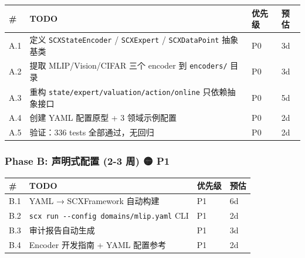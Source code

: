 \documentclass[
  12pt,
]{ctexart}
\begin{document}
\begin{longtable}[]{@{}
  >{\raggedright\arraybackslash}p{}
  >{\raggedright\arraybackslash}p{}
  >{\raggedright\arraybackslash}p{}
  >{\raggedright\arraybackslash}p{}@{}}
\toprule\noalign{}
\begin{minipage}[b]{\linewidth}\raggedright
\#
\end{minipage} & \begin{minipage}[b]{\linewidth}\raggedright
TODO
\end{minipage} & \begin{minipage}[b]{\linewidth}\raggedright
优先级
\end{minipage} & \begin{minipage}[b]{\linewidth}\raggedright
预估
\end{minipage} \\
\midrule\noalign{}
\endhead
\bottomrule\noalign{}
\endlastfoot
A.1 & 定义 \texttt{SCXStateEncoder} / \texttt{SCXExpert} /
\texttt{SCXDataPoint} 抽象基类 & P0 & 3d \\
A.2 & 提取 MLIP/Vision/CIFAR 三个 encoder 到 \texttt{encoders/} 目录 &
P0 & 3d \\
A.3 & 重构 \texttt{state/expert/valuation/action/online} 只依赖抽象接口
& P0 & 5d \\
A.4 & 创建 YAML 配置原型 + 3 领域示例配置 & P0 & 2d \\
A.5 & 验证：336 tests 全部通过，无回归 & P0 & 2d \\
\end{longtable}

\subsubsection{Phase B: 声明式配置 (2-3 周) 🟡
P1}\label{phase-b-ux58f0ux660eux5f0fux914dux7f6e-2-3-ux5468-p1}

\begin{longtable}[]{@{}llll@{}}
\toprule\noalign{}
\# & TODO & 优先级 & 预估 \\
\midrule\noalign{}
\endhead
\bottomrule\noalign{}
\endlastfoot
B.1 & YAML → SCXFramework 自动构建 & P1 & 6d \\
B.2 & \texttt{scx\ run\ -\/-config\ domains/mlip.yaml} CLI & P1 & 2d \\
B.3 & 审计报告自动生成 & P1 & 3d \\
B.4 & Encoder 开发指南 + YAML 配置参考 & P1 & 2d \\
\end{longtable}
\end{document}
